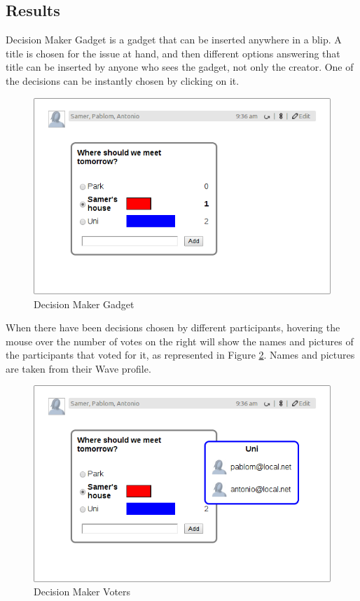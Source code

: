 \subsection{Results}
Decision Maker Gadget is a gadget that can be inserted anywhere in a blip. A title is chosen for the issue at hand, and then different options answering that title can be inserted by anyone who sees the gadget, not only the creator. One of the decisions can be instantly chosen by clicking on it.
\begin{figure}[H]
  \center
    \includegraphics[keepaspectratio, scale=0.4]{Media/Captures/Extensions/DecisionMakerGadget.png}
  \caption{Decision Maker Gadget}
  \label{fig:decision_maker_gadget}
\end{figure}
When there have been decisions chosen by different participants, hovering the mouse over the number of votes on the right will show the names and pictures of the participants that voted for it, as represented in Figure \ref{fig:decision_maker_votes}. Names and pictures are taken from their Wave profile.
\begin{figure}[H]
  \center
    \includegraphics[keepaspectratio, scale=0.4]{Media/Captures/Extensions/DecisionMakerGadget_votes.png}
  \caption{Decision Maker Voters}
  \label{fig:decision_maker_votes}
\end{figure}
